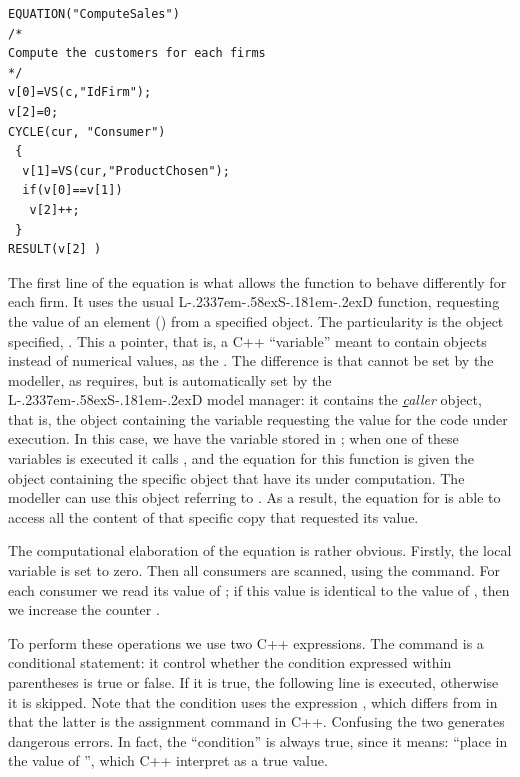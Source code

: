 \documentclass [11pt,a4paper] {book}
\def\LsD{{L\kern-.2337em\lower-.58ex\hbox{S}\kern-.181em\lower-.2ex\hbox{D}}\xspace}
\begin{document}
\begin{minipage}[h]{10cm}
\small
\begin{verbatim}
EQUATION("ComputeSales")
/*
Compute the customers for each firms
*/
v[0]=VS(c,"IdFirm");
v[2]=0;
CYCLE(cur, "Consumer")
 {
  v[1]=VS(cur,"ProductChosen");
  if(v[0]==v[1])
   v[2]++;
 }
RESULT(v[2] )

\end{verbatim}
\normalsize
\end{minipage}

The first line of the equation is what allows the function to behave differently for each firm. It uses the usual  \LsD function, requesting the value of an element () from a specified object. The particularity is the object specified, . This a pointer, that is, a C++ ``variable'' meant to contain objects instead of numerical values, as the . The difference is that  cannot be set by the modeller, as  requires, but is automatically set by the \LsD model manager: it contains the \textit{\underline{c}aller} object, that is, the object containing the variable requesting the value for the code under execution. In this case, we have the variable  stored in ; when one of these variables is executed it calls , and the equation for this function is given the object containing the specific object  that have its  under computation. The modeller can use this object referring to . As a result, the equation for  is able to access all the content of that specific copy that requested its value.

The computational elaboration of the equation is rather obvious. Firstly, the local variable  is set to zero. Then all consumers are scanned, using the  command. For each consumer we read its value of ; if this value is identical to the value of , then we increase the counter .

To perform these operations we use two C++ expressions. The  command is a conditional statement: it control whether the condition expressed within parentheses is true or false. If it is true, the following line is executed, otherwise it is skipped. Note that the condition uses the expression \code{==}, which differs from \code{=} in that the latter is the assignment command in C++. Confusing the two generates dangerous errors. In fact, the ``condition''  is always true, since it means: ``place in  the value of '', which C++ interpret as a true value.
\end{document}
